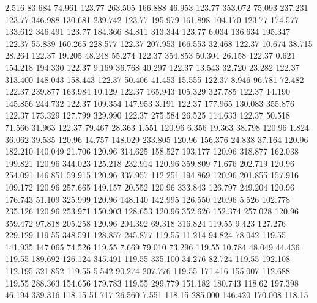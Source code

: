    2.516   83.684   74.961       123.77
 263.505  166.888   46.953       123.77
 353.072   75.093  237.231       123.77
 346.988  130.681  239.742       123.77
 195.979  161.898  104.170       123.77
 174.577  133.612  346.491       123.77
 184.366   84.811  313.344       123.77
   6.034  136.634  195.347       122.37
  55.839  160.265  228.577       122.37
 207.953  166.553   32.468       122.37
  10.674   38.715   28.264       122.37
  19.205   48.248   55.274       122.37
 354.853   50.304   26.158       122.37
   0.621  154.218  194.330       122.37
   9.169   36.768   40.297       122.37
  13.543   32.720   23.282       122.37
 313.400  148.043  158.443       122.37
  50.406   41.453   15.555       122.37
   8.946   96.781   72.482       122.37
 239.877  163.984   10.129       122.37
 165.943  105.329  327.785       122.37
  14.190  145.856  244.732       122.37
 109.354  147.953    3.191       122.37
 177.965  130.083  355.876       122.37
 173.329  127.799  329.990       122.37
 275.584   26.525  114.633       122.37
  50.518   71.566   31.963       122.37
  79.467   28.363    1.551       120.96
   6.356   19.363   38.798       120.96
   1.824   36.062   39.535       120.96
  14.757  148.029  233.805       120.96
 156.376   24.838   37.164       120.96
 182.210  140.049   21.706       120.96
 314.625  158.527  193.177       120.96
 318.877  162.038  199.821       120.96
 344.023  125.218  232.914       120.96
 359.809   71.676  202.719       120.96
 254.091  146.851   59.915       120.96
 337.957  112.251  194.869       120.96
 201.855  157.916  109.172       120.96
 257.665  149.157   20.552       120.96
 333.843  126.797  249.204       120.96
 176.743   51.109  325.999       120.96
 148.140  142.995  126.550       120.96
   5.526  102.778  235.126       120.96
 253.971  150.903  128.653       120.96
 352.626  152.374  257.028       120.96
 359.472   97.818  205.258       120.96
 204.392   69.318  316.824       119.55
   9.423  127.276  229.129       119.55
 348.591  128.857  245.877       119.55
  11.214   94.824   78.042       119.55
 141.935  147.065   74.526       119.55
   7.669   79.010   73.296       119.55
  10.784   48.049   44.436       119.55
 189.692  126.124  345.491       119.55
 335.100   34.276   82.724       119.55
 192.108  112.195  321.852       119.55
   5.542   90.274  207.776       119.55
 171.416  155.007  112.688       119.55
 288.363  154.656  179.783       119.55
 299.779  151.182  180.743       118.62
 197.398   46.194  339.316       118.15
  51.717   26.560    7.551       118.15
 285.000  146.420  170.008       118.15
